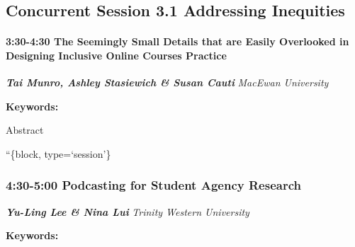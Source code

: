 \documentclass[
]{book}
\begin{document}
\hypertarget{concurrent-session-3.1-addressing-inequities}{%
\subsection*{Concurrent Session 3.1 \textbar{} Addressing Inequities}\label{concurrent-session-3.1-addressing-inequities}}

\begin{session}
\hypertarget{the-seemingly-small-details-that-are-easily-overlooked-in-designing-inclusive-online-courses-practice}{%
\paragraph*{\texorpdfstring{3:30-4:30 \textbar{} \textbf{The Seemingly
Small Details that are Easily Overlooked in Designing Inclusive Online
Courses} \textbar{}
Practice}{3:30-4:30 \textbar{} The Seemingly Small Details that are Easily Overlooked in Designing Inclusive Online Courses \textbar{} Practice}}\label{the-seemingly-small-details-that-are-easily-overlooked-in-designing-inclusive-online-courses-practice}}

\textbf{\emph{Tai Munro, Ashley Stasiewich \& Susan Cauti}} \textbar{}
\emph{MacEwan University}

\textbf{Keywords:}

Abstract
\end{session}

``\{block, type=`session'\}

\hypertarget{podcasting-for-student-agency-research}{%
\subsubsection*{\texorpdfstring{4:30-5:00 \textbar{} \textbf{Podcasting for Student Agency} \textbar{} Research}{4:30-5:00 \textbar{} Podcasting for Student Agency \textbar{} Research}}\label{podcasting-for-student-agency-research}}

\textbf{\emph{Yu-Ling Lee \& Nina Lui}} \textbar{} \emph{Trinity Western University}

\textbf{Keywords:}
\end{document}
